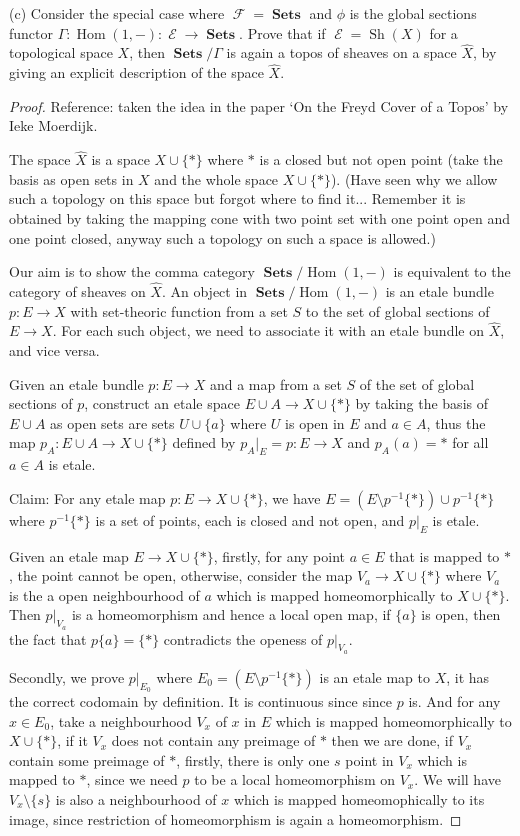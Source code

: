 \documentclass[a4paper]{article}
\DeclareMathOperator{\Sets}{\mathbf {Sets}}
\DeclareMathOperator{\Hom}{\text {Hom}}
\DeclareMathOperator{\Sh}{\text {Sh}}
\DeclareMathOperator{\E}{\mathcal E}
\DeclareMathOperator{\F}{\mathcal F}
\begin{document}
(c) Consider the special case where $\F=\Sets$ and $\phi$ is the global sections functor $\Gamma:\Hom(1,-):\E\to \Sets$. Prove that if $\E=\Sh(X)$ for a topological space $X$, then $\Sets/\Gamma$ is again a topos of sheaves on a space $\hat{X}$, by giving an explicit description of the space $\hat{X}$.
\begin{proof}
    Reference: taken the idea in the paper `On the Freyd Cover of a Topos' by Ieke Moerdijk.

    The space $\hat{X}$ is a space $X\cup \{*\}$ where $*$ is a closed but not open point (take the basis as open sets in $X$ and the whole space $X\cup \{*\}$). (Have seen why we allow such a topology on this space but forgot where to find it... Remember it is obtained by taking the mapping cone with two point set with one point open and one point closed, anyway such a topology on such a space is allowed.)

    Our aim is to show the comma category $\Sets/\Hom(1,-)$ is equivalent to the category of sheaves on $\hat{X}$. An object in $\Sets/\Hom(1,-)$ is an etale bundle $p:E\to X$ with set-theoric function from a set $S$ to the set of global sections of $E\to X$. For each such object, we need to associate it with an etale bundle on $\hat{X}$, and vice versa.

    Given an etale bundle $p:E\to X$ and a map from a set $S$ of the set of global sections of $p$, construct an etale space $E\cup A\to X\cup \{*\}$ by taking the basis of $E\cup A$ as open sets are sets $U\cup \{a\}$ where $U$ is open in $E$ and $a\in A$, thus the map $p_A:E\cup A\to X\cup \{*\}$ defined by $p_A|_{E}=p:E\to X$ and $p_A(a)=*$ for all $a\in A$ is etale.

    Claim: For any etale map $p:E\to X\cup \{*\}$, we have $E=(E\setminus p^{-1}\{*\})\cup p^{-1}\{*\}$ where $p^{-1}\{*\}$ is a set of points, each is closed and not open, and $p|_E$ is etale.

    Given an etale map $E\to X\cup \{*\}$, firstly, for any point $a\in E$ that is mapped to $*$, the point cannot be open, otherwise, consider the map $V_a\to X\cup \{*\}$ where $V_a$ is the a open neighbourhood of $a$ which is mapped homeomorphically to $X\cup\{*\}$. Then $p|_{V_a}$ is a homeomorphism and hence a local open map, if $\{a\}$ is open, then the fact that $p\{a\}=\{*\}$ contradicts the openess of $p|_{V_a}$.

    Secondly, we prove $p|_{E_0}$ where $E_0= (E\setminus p^{-1}\{*\})$ is an etale map to $X$, it has the correct codomain by definition. It is continuous since since $p$ is. And for any $x\in E_0$, take a neighbourhood $V_x$ of $x$ in $E$ which is mapped homeomorphically to $X\cup \{*\}$, if it $V_x$ does not contain any preimage of $*$ then we are done, if $V_x$ contain some preimage of $*$, firstly, there is only one $s$ point in $V_x$ which is mapped to $*$, since we need $p$ to be a local homeomorphism on $V_x$. We will have $V_x\setminus \{s\}$ is also a neighbourhood of $x$ which is mapped homeomophically to its image, since restriction of homeomorphism is again a homeomorphism.


\end{proof}
\end{document}
